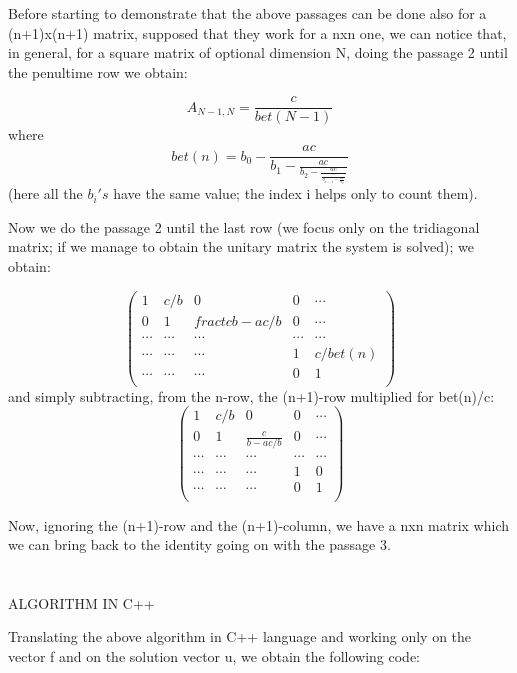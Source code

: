 \documentclass {article}
\begin{document}
Before starting to demonstrate that the above passages can be done also for a (n+1)x(n+1) matrix, supposed that they work for a nxn one, we can notice that, in general, for a square matrix of optional dimension N, doing the passage 2 until the penultime row we obtain:

$$A_{N-1,N}=\frac{c}{bet(N-1)}$$
where 
$$bet(n)=b_0-\frac{ac}{b_1-\frac{ac}{b_2-\frac{ac}{\frac{\cdots}{b_{n-1}-\frac{ac}{b_n}}}}}$$
(here all the $b_i's$ have the same value; the index i helps only to count them).

Now we do the passage 2 until the last row (we focus only on the tridiagonal matrix; if we manage to obtain the unitary matrix the system is solved); we obtain:

\begin{equation}
\left(
\begin{array}{ccccc}
  1 & c/b & 0 & 0 & \cdots \\
  0 & 1 & fract{c}{b-ac/b} & 0 & \cdots \\
  \cdots & \cdots & \cdots & \cdots & \cdots \\
  \cdots & \cdots & \cdots & 1 & c/bet(n) \\
  \cdots & \cdots & \cdots & 0 & 1 \\
\end{array}
\right)
\end{equation}
and simply subtracting, from the n-row, the (n+1)-row multiplied for bet(n)/c:
\begin{equation}
\left(
\begin{array}{ccccc}
  1 & c/b & 0 & 0 & \cdots \\
  0 & 1 & \frac{c}{b-ac/b} & 0 & \cdots \\
  \cdots & \cdots & \cdots & \cdots & \cdots \\
  \cdots & \cdots & \cdots & 1 & 0 \\
  \cdots & \cdots & \cdots & 0 & 1 \\
\end{array}
\right)
\end{equation}

Now, ignoring the (n+1)-row and the (n+1)-column, we have a nxn matrix which we can bring back to the identity going on with the passage 3.
\\
\\
\\
ALGORITHM IN C++

Translating the above algorithm in C++ language and working only on the vector f and on the solution vector u, we obtain the following code:
\end{document}
